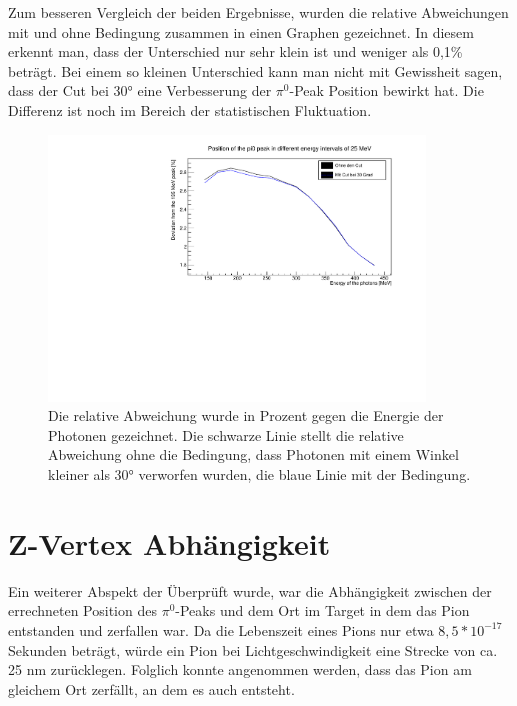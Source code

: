 \documentclass[a4paper,11pt,oneside,final,german,openbib,pdftex]{scrbook}
\begin{document}
Zum besseren Vergleich der beiden Ergebnisse, wurden die relative Abweichungen mit und ohne Bedingung zusammen in einen Graphen gezeichnet. In diesem erkennt man, dass der Unterschied nur sehr klein ist und weniger als 0,1\% betr\"agt. Bei einem so kleinen Unterschied kann man nicht mit Gewissheit sagen, dass der Cut bei 30° eine Verbesserung der $\pi^0$-Peak Position bewirkt hat. Die Differenz ist noch im Bereich der statistischen Fluktuation. 

\begin{figure}[h!]
	\begin{center}
		\includegraphics[width=100mm]{EnergyAngleBothRelativeDeviation}
		\caption{Die relative Abweichung wurde in Prozent gegen die Energie der Photonen gezeichnet. Die schwarze Linie stellt die relative Abweichung ohne die Bedingung, dass Photonen mit einem Winkel kleiner als 30° verworfen wurden, die blaue Linie mit der Bedingung.}
	\end{center}
\end{figure}

\section{Z-Vertex Abh\"angigkeit}
\label{sec:Z-Vertex-Abaengigkeit}
Ein weiterer Abspekt der \"Uberpr\"uft wurde, war die Abh\"angigkeit zwischen der errechneten  Position des $\pi^0$-Peaks und dem Ort im Target in dem das Pion entstanden und zerfallen war. Da die Lebenszeit eines Pions nur etwa $8,5*10^{-17}$ Sekunden betr\"agt, w\"urde ein Pion bei Lichtgeschwindigkeit eine Strecke von ca. 25 nm zur\"ucklegen. Folglich konnte angenommen werden, dass das Pion am gleichem Ort zerf\"allt, an dem es auch entsteht.

 
\end{document}
